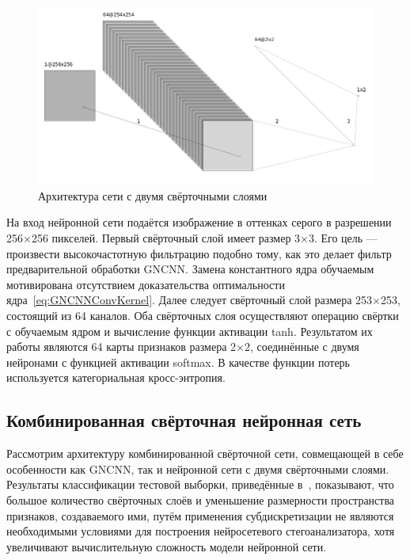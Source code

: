 \begin{figure}[!htb]
\centering
\includegraphics[width=1\textwidth]{include/graphics/french_gray_architecture}
\caption{Архитектура сети с двумя свёрточными слоями}
\label{fig:FrenchCNNArchitecture}
\end{figure}

На вход нейронной сети подаётся изображение в оттенках серого в разрешении 256×256 пикселей. Первый свёрточный слой имеет размер 3×3. Его цель --- произвести высокочастотную фильтрацию подобно тому, как это делает фильтр предварительной обработки GNCNN. Замена константного ядра обучаемым мотивирована отсутствием доказательства оптимальности ядра~\ref{eq:GNCNNConvKernel}. Далее следует свёрточный слой размера 253×253, состоящий из 64 каналов. Оба свёрточных слоя осуществляют операцию свёртки с обучаемым ядром и вычисление функции активации tanh. Результатом их работы являются 64 карты признаков размера 2×2, соединённые с двумя нейронами с функцией активации softmax. В качестве функции потерь используется категориальная кросс-энтропия.

\subsection{Комбинированная свёрточная нейронная сеть}

Рассмотрим архитектуру комбинированной свёрточной сети, совмещающей в себе особенности как GNCNN, так и нейронной сети с двумя свёрточными слоями. Результаты классификации тестовой выборки, приведённые в~\cite{FrenchCNN}, показывают, что большое количество свёрточных слоёв и уменьшение размерности пространства признаков, создаваемого ими, путём применения субдискретизации не являются необходимыми условиями для построения нейросетевого стегоанализатора, хотя увеличивают вычислительную сложность модели нейронной сети.

